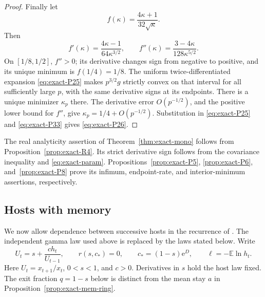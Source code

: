 \begin{proof}
Finally let
\begin{equation}
 f(\kappa)=\frac{4\kappa+1}{32\sqrt\kappa}.
\end{equation}
Then
\begin{equation}
 f'(\kappa)=\frac{4\kappa-1}{64\kappa^{3/2}},\qquad
 f''(\kappa)=\frac{3-4\kappa}{128\kappa^{5/2}}.
\end{equation}
On \([1/8,1/2]\), \(f''>0\); its derivative changes sign from negative to positive, and its unique minimum is \(f(1/4)=1/8\).
The uniform twice-differentiated expansion \eqref{eq:exact-P25} makes \(p^{3/2}g\) strictly convex on that interval for all sufficiently large \(p\), with the same derivative signs at its endpoints. There is a unique minimizer \(\kappa_p\) there. The derivative error \(O(p^{-1/2})\), and the positive lower bound for \(f''\), give
\(\kappa_p=1/4+O(p^{-1/2})\). Substitution in \eqref{eq:exact-P25} and \eqref{eq:exact-P33} gives \eqref{eq:exact-P26}. \end{proof}

The real analyticity assertion of Theorem~\ref{thm:exact-mono} follows from Proposition~\ref{prop:exact-R4}. Its strict derivative sign follows from the covariance inequality and \eqref{eq:exact-param}. Propositions~\ref{prop:exact-P5}, \ref{prop:exact-P6}, and~\ref{prop:exact-P8} prove its infimum, endpoint-rate, and interior-minimum assertions, respectively.

\subsection{Hosts with memory}\label{subsec:exact-app-memory}

We now allow dependence between successive hosts in the recurrence of
\citet{roerdink1988}. The independent gamma law used above is replaced by
the laws stated below. Write
\begin{equation}
 U_t=s+\frac{c h_t}{U_{t-1}},\qquad
 r(s,c_*)=0,\qquad c_*=(1-s)\mathrm{e}^D,
 \qquad \ell=-\mathbb E\ln h_t.
 \label{eq:exact-mem-def}
\end{equation}
Here $U_t=x_{t+1}/x_t$, $0<s<1$, and $c>0$. Derivatives in $s$ hold
the host law fixed. The exit fraction $q=1-s$ below is distinct from
the mean stay $a$ in Proposition~\ref{prop:exact-mem-ring}.

